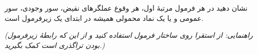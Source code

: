 نشان دهید در هر فرمول مرتبه‌ٔ اول، هر وقوع عملگرهای نقیض، سور وجودی، سور عمومی و یا یک نماد محمولی  همیشه در ابتدای یک زیرفرمول است.

\emph{(راهنمایی: از استقرا روی ساختار فرمول استفاده کنید و از این که رابطهٔ زیرفرمول بودن تراگذری است کمک بگیرید.)}